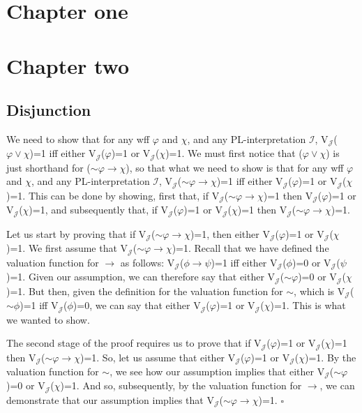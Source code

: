 \documentclass[sloppy, journal, git, bytitle]{humapap}
\begin{document}
\documenttitle

\section{Chapter one}
\section{Chapter two}
\subsection{Disjunction}
We need to show that for any wff $\varphi$ and $\chi$, and any PL-interpretation $\mathcal{I}$, V$\mathcal{_J}$($\varphi\vee\chi$)=1 iff either V$\mathcal{_J}$($\varphi$)=1 or V$\mathcal{_J}$($\chi$)=1. We must first notice that ($\varphi \vee \chi$) is just shorthand for ($\sim\varphi\rightarrow\chi$), so that what we need to show is that for any wff $\varphi$ and $\chi$, and any PL-interpretation $\mathcal{I}$, V$\mathcal{_J}$($\sim\varphi\rightarrow\chi$)=1 iff either V$\mathcal{_J}$($\varphi$)=1 or V$\mathcal{_J}$($\chi$)=1. This can be done by showing, first that, if V$\mathcal{_J}$($\sim\varphi\rightarrow\chi$)=1 then V$\mathcal{_J}$($\varphi$)=1 or V$\mathcal{_J}$($\chi$)=1, and subsequently that, if V$\mathcal{_J}$($\varphi$)=1 or V$\mathcal{_J}$($\chi$)=1 then V$\mathcal{_J}$($\sim\varphi \rightarrow\chi$)=1.

Let us start by proving that if V$\mathcal{_J}$($\sim\varphi\rightarrow\chi$)=1, then either V$\mathcal{_J}$($\varphi$)=1 or V$\mathcal{_J}$($\chi$)=1. We first assume that V$\mathcal{_J}$($\sim\varphi\rightarrow\chi$)=1. Recall that we have defined the valuation function for $\rightarrow$ as follows: V$\mathcal{_J}$($\phi\rightarrow\psi$)=1 iff either V$\mathcal{_J}$($\phi$)=0 or V$\mathcal{_J}$($\psi$)=1. Given our assumption, we can therefore say that either V$\mathcal{_J}$($\sim\varphi$)=0 or V$\mathcal{_J}$($\chi$)=1. But then, given the definition for the valuation function for $\sim$, which is V$\mathcal{_J}$($\sim\phi$)=1 iff V$\mathcal{_J}$($\phi$)=0, we can say that either V$\mathcal{_J}$($\varphi$)=1 or V$\mathcal{_J}$($\chi$)=1. This is what we wanted to show.

The second stage of the proof requires us to prove that if V$\mathcal{_J}$($\varphi$)=1 or V$\mathcal{_J}$($\chi$)=1 then V$\mathcal{_J}$($\sim\varphi\rightarrow\chi$)=1. So, let us assume that either V$\mathcal{_J}$($\varphi$)=1 or V$\mathcal{_J}$($\chi$)=1. By the valuation function for $\sim$, we see how our assumption implies that either  V$\mathcal{_J}$($\sim\varphi$)=0 or V$\mathcal{_J}$($\chi$)=1. And so, subsequently, by the valuation function for $\rightarrow$, we can demonstrate that our assumption implies that V$\mathcal{_J}$($\sim\varphi\rightarrow\chi$)=1. $\square$
\end{document}
